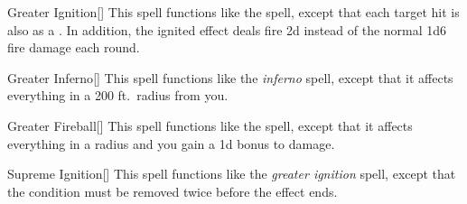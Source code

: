 \lowercase{\hypertarget{spell:Greater Ignition}{}}\label{spell:Greater Ignition}
\begin{apability}[\nth{4}]{\hypertarget{spell:Greater Ignition}{Greater Ignition}}[]
This spell functions like the  spell, except that each target hit is also  as a .
In addition, the ignited effect deals fire  \minus2d instead of the normal 1d6 fire damage each round.
\end{apability}
\vspace{0.25em}



\lowercase{\hypertarget{spell:Greater Inferno}{}}\label{spell:Greater Inferno}
\begin{apability}[\nth{5}]{\hypertarget{spell:Greater Inferno}{Greater Inferno}}[]
This spell functions like the \textit{inferno} spell, except that it affects everything in a 200 ft.\ radius from you.
\end{apability}
\vspace{0.25em}



\lowercase{\hypertarget{spell:Greater Fireball}{}}\label{spell:Greater Fireball}
\begin{apability}[\nth{6}]{\hypertarget{spell:Greater Fireball}{Greater Fireball}}[]
This spell functions like the  spell, except that it affects everything in a \arealarge radius and you gain a \plus1d bonus to damage.
\end{apability}
\vspace{0.25em}



\lowercase{\hypertarget{spell:Supreme Ignition}{}}\label{spell:Supreme Ignition}
\begin{apability}[\nth{6}]{\hypertarget{spell:Supreme Ignition}{Supreme Ignition}}[]
This spell functions like the \textit{greater ignition} spell, except that the condition must be removed twice before the effect ends.
\end{apability}
\vspace{0.25em}


